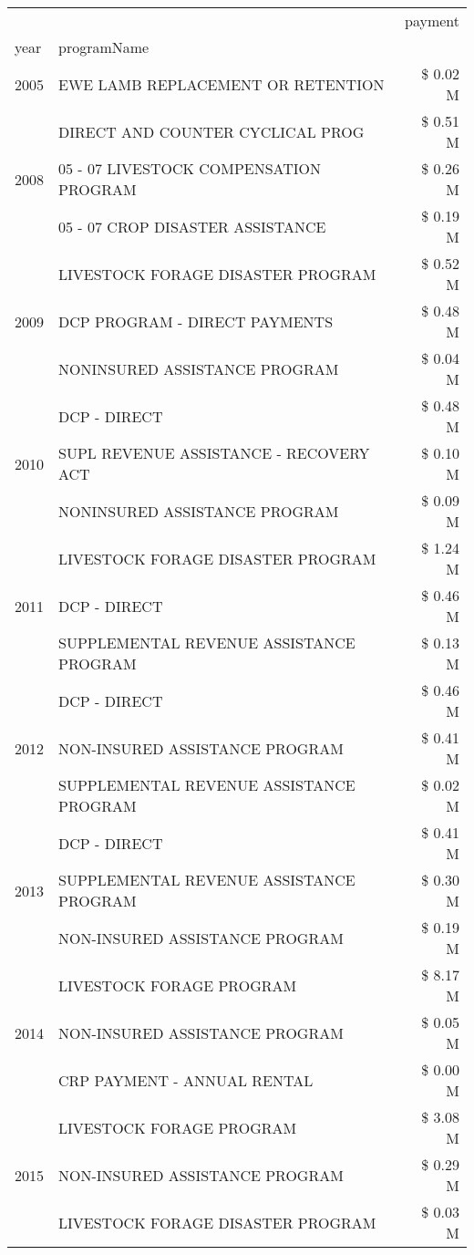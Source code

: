 \begin{tabular}{llr}
\toprule
 &  & payment \\
year & programName &  \\
\midrule
2005 & EWE LAMB REPLACEMENT OR RETENTION & \$ 0.02 M \\
\cline{1-3}
\multirow[t]{3}{*}{2008} & DIRECT AND COUNTER CYCLICAL PROG & \$ 0.51 M \\
 & 05 - 07 LIVESTOCK COMPENSATION PROGRAM & \$ 0.26 M \\
 & 05 - 07 CROP DISASTER ASSISTANCE & \$ 0.19 M \\
\cline{1-3}
\multirow[t]{3}{*}{2009} & LIVESTOCK FORAGE DISASTER  PROGRAM & \$ 0.52 M \\
 & DCP PROGRAM - DIRECT PAYMENTS & \$ 0.48 M \\
 & NONINSURED ASSISTANCE PROGRAM & \$ 0.04 M \\
\cline{1-3}
\multirow[t]{3}{*}{2010} & DCP - DIRECT & \$ 0.48 M \\
 & SUPL REVENUE ASSISTANCE - RECOVERY ACT & \$ 0.10 M \\
 & NONINSURED ASSISTANCE PROGRAM & \$ 0.09 M \\
\cline{1-3}
\multirow[t]{3}{*}{2011} & LIVESTOCK FORAGE DISASTER PROGRAM & \$ 1.24 M \\
 & DCP - DIRECT & \$ 0.46 M \\
 & SUPPLEMENTAL REVENUE ASSISTANCE PROGRAM & \$ 0.13 M \\
\cline{1-3}
\multirow[t]{3}{*}{2012} & DCP - DIRECT & \$ 0.46 M \\
 & NON-INSURED ASSISTANCE PROGRAM & \$ 0.41 M \\
 & SUPPLEMENTAL REVENUE ASSISTANCE PROGRAM & \$ 0.02 M \\
\cline{1-3}
\multirow[t]{3}{*}{2013} & DCP - DIRECT & \$ 0.41 M \\
 & SUPPLEMENTAL REVENUE ASSISTANCE PROGRAM & \$ 0.30 M \\
 & NON-INSURED ASSISTANCE PROGRAM & \$ 0.19 M \\
\cline{1-3}
\multirow[t]{3}{*}{2014} & LIVESTOCK FORAGE PROGRAM & \$ 8.17 M \\
 & NON-INSURED ASSISTANCE PROGRAM & \$ 0.05 M \\
 & CRP PAYMENT - ANNUAL RENTAL & \$ 0.00 M \\
\cline{1-3}
\multirow[t]{3}{*}{2015} & LIVESTOCK FORAGE PROGRAM & \$ 3.08 M \\
 & NON-INSURED ASSISTANCE PROGRAM & \$ 0.29 M \\
 & LIVESTOCK FORAGE DISASTER PROGRAM & \$ 0.03 M \\

\end{tabular}
